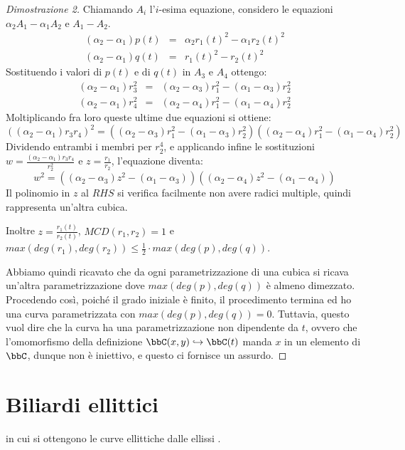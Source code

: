 \begin{proof}[Dimostrazione 2]
Chiamando $A_i$ l'$i$-esima equazione, considero le equazioni $\alpha_2A_1-\alpha_1A_2$ e $A_1-A_2$.
\begin{eqnarray*}
  (\alpha_2-\alpha_1)p(t) &=& \alpha_2r_1(t)^2-\alpha_1r_2(t)^2 \\
  (\alpha_2-\alpha_1)q(t) &=& r_1(t)^2-r_2(t)^2
\end{eqnarray*}
Sostituendo i valori di $p(t)$ e di $q(t)$ in $A_3$ e $A_4$ ottengo:
\begin{eqnarray*}
  (\alpha_2-\alpha_1)r_3^2 &=& (\alpha_2-\alpha_3)r_1^2-(\alpha_1-\alpha_3)r_2^2 \\
  (\alpha_2-\alpha_1)r_4^2 &=& (\alpha_2-\alpha_4)r_1^2-(\alpha_1-\alpha_4)r_2^2
\end{eqnarray*}
Moltiplicando fra loro queste ultime due equazioni si ottiene:
\begin{equation*}
  ((\alpha_2-\alpha_1)r_3r_4)^2 = ((\alpha_2-\alpha_3)r_1^2-(\alpha_1-\alpha_3)r_2^2)((\alpha_2-\alpha_4)r_1^2-(\alpha_1-\alpha_4)r_2^2)
\end{equation*}
Dividendo entrambi i membri per $r_2^4$, e applicando infine le sostituzioni $w=\frac{(\alpha_2-\alpha_1)r_3r_4}{r_2^2}$ e $z=\frac{r_1}{r_2}$, l'equazione diventa:
$$w^2=((\alpha_2-\alpha_3)z^2-(\alpha_1-\alpha_3))((\alpha_2-\alpha_4)z^2-(\alpha_1-\alpha_4))$$
Il polinomio in $z$ al $RHS$ si verifica facilmente non avere radici multiple, quindi rappresenta un'altra cubica.

Inoltre $z=\frac{r_1(t)}{r_2(t)}$, $MCD(r_1,r_2)=1$ e $max(deg(r_1), deg(r_2))\leq\frac{1}{2}\cdot max(deg(p),deg(q))$.

Abbiamo quindi ricavato che da ogni parametrizzazione di una cubica si ricava un'altra parametrizzazione dove $max(deg(p),deg(q))$ è almeno dimezzato.
Procedendo così, poiché il grado iniziale è finito, il procedimento termina ed ho una curva parametrizzata con $max(deg(p),deg(q))=0$.
Tuttavia, questo vuol dire che la curva ha una parametrizzazione non dipendente da $t$, ovvero che l'omomorfismo della definizione $\bbC(x,y)\hookrightarrow\bbC(t)$ manda $x$ in un elemento di $\bbC$, dunque non è iniettivo, e questo ci fornisce un assurdo.
\end{proof}

\chapter{Biliardi ellittici}
 in cui si ottengono le curve
ellittiche dalle ellissi .

